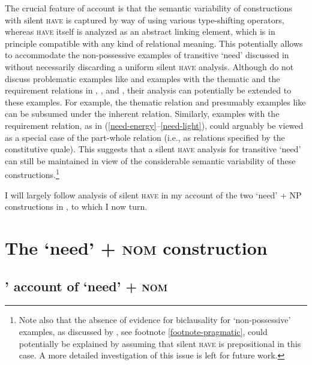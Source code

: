 \documentclass[output=paper]{langscibook}
\begin{document}
    \largerpage[-1] %

The crucial feature of  account is that the semantic variability of constructions with silent \textsc{have} is captured by way of using various type-shifting operators, whereas \textsc{have} itself is analyzed as an abstract linking element, which is in principle compatible with any kind of relational meaning. This potentially allows to accommodate the non-possessive examples of transitive `need' discussed in  without necessarily discarding a uniform silent \textsc{have} analysis.
Although \citeauthor{Zaroukian.Beller2013} do not discuss problematic examples like  and examples with the thematic and the requirement relations in , , and , their analysis can potentially be extended to these examples. For example, the thematic relation and presumably examples like  can be subsumed under the inherent relation. Similarly, examples with the requirement relation, as in (\ref{need-energy}--\ref{need-light}), could arguably be viewed as a special case of the part-whole relation (i.e., as relations specified by the constitutive quale). This suggests that a silent \textsc{have} analysis for transitive `need' can still be maintained in view of the considerable semantic variability of these constructions.\footnote{Note also that the absence of evidence for biclausality for `non-possessive' examples, as discussed by \citet{Schwarz2006}, see footnote \ref{footnote-pragmatic}, could potentially be explained by assuming that silent \textsc{have} is prepositional in this case. A more detailed investigation of this issue is left for future work.\label{footnote-telic}}

I will largely follow  analysis of silent \textsc{have} in my account of the two `need' + NP constructions in , to which I now turn.

\section{The `need' + \textsc{nom} construction}\label{section-nom}

\subsection{\citeauthor{Harves2008}' account of `need' + \textsc{nom} }\label{section-harves}
\end{document}
